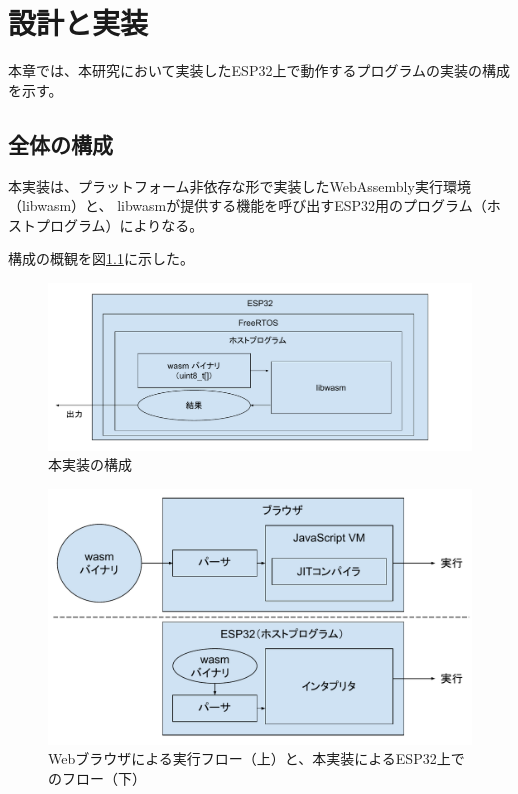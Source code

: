 \chapter{設計と実装}
\label{chap:implementation}

本章では、本研究において実装したESP32上で動作するプログラムの実装の構成を示す。

\section{全体の構成}

本実装は、プラットフォーム非依存な形で実装したWebAssembly実行環境（libwasm）と、
libwasmが提供する機能を呼び出すESP32用のプログラム（ホストプログラム）によりなる。

構成の概観を図\ref{fig:esp32_libwasm}に示した。

\begin{figure}[htbp]
  \caption{本実装の構成}
  \label{fig:esp32_libwasm}
  \begin{center}
    \includegraphics[bb=0 0 800 300,width=12cm]{img/esp32_libwasm.pdf}
  \end{center}
\end{figure}

\begin{figure}[htbp]
  \caption{Webブラウザによる実行フロー（上）と、本実装によるESP32上でのフロー（下）}
  \label{fig:browser_vs_libwasm}
  \begin{center}
    \includegraphics[bb=0 0 706 427,width=15cm]{img/browser_vs_libwasm.pdf}
  \end{center}
\end{figure}

